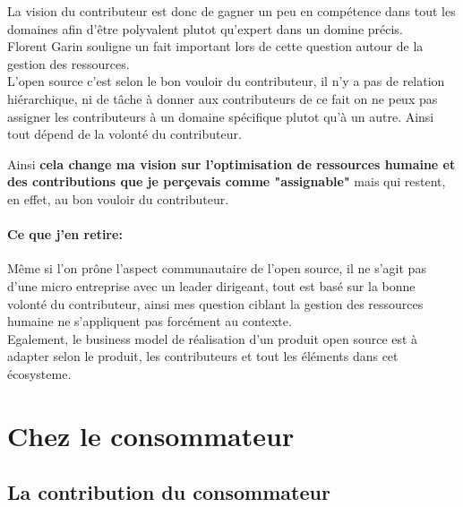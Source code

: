 			La vision du contributeur est donc de gagner un peu en compétence dans tout les domaines afin d'être polyvalent plutot qu'expert dans un domine précis.\\

			Florent Garin souligne un fait important lors de cette question autour de la gestion des ressources.\\

			L'open source c'est selon le bon vouloir du contributeur, il n'y a pas de relation hiérarchique, ni de tâche à donner aux contributeurs de ce fait on ne peux pas assigner les contributeurs à un domaine spécifique plutot qu'à un autre. Ainsi tout dépend de la volonté du contributeur.

			\begin{center}
				\textit{
				}
			\end{center}

			Ainsi \textbf{cela change ma vision sur l'optimisation de ressources humaine et des contributions que je perçevais comme "assignable"} mais qui restent, en effet, au bon vouloir du contributeur.

		\paragraph{Ce que j'en retire:\\}

			Même si l'on prône l'aspect communautaire de l'open source, il ne s'agit pas d'une micro entreprise avec un leader dirigeant, tout est basé sur la bonne volonté du contributeur, ainsi mes question ciblant la gestion des ressources humaine ne s'appliquent pas forcément au contexte.\\ Egalement, le business model de réalisation d'un produit open source est à adapter selon le produit, les contributeurs et tout les éléments dans cet écosysteme.

	\section{Chez le consommateur}

		\subsection{La contribution du consommateur}

